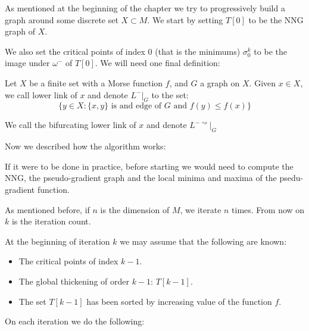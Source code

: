 As mentioned at the beginning of the chapter we try to progressively build a 
graph around some discrete set $X\subset M$. We start by setting
$T[0]$ to be the NNG graph of $X$.

We also set the critical points of index $0$ (that is the minimums) 
$\sigma_0^k$ to be the image under $\omega^-$
of $T[0]$.
We will need one final definition:

\begin{definition}
    Let $X$ be a finite set with a Morse function $f$, and $G$ a graph on $X$.
    Given $x\in X$, we call lower link of $x$ and denote $L^-\vert_G$ to the 
    set:
    $$
        \{y\in X: \{x,y\} \text{ is and edge of } G \text{ and } f(y)\leq f(x)\}
    $$
    
    We call the bifurcating lower link of $x$ and denote $L^{-\rightsquigarrow}\vert_G$
\end{definition}

Now we described how the algorithm works:

If it were to be done in practice, before starting we would need to 
compute the NNG, the pseudo-gradient graph and the local minima and maxima 
of the psedu-gradient function.

As mentioned before, if $n$ is the dimension of $M$,
we iterate $n$ times. 
From now on $k$ is the iteration count.

At the beginning of iteration $k$ we may assume 
that the following are known:

\begin{itemize}
    \item The critical points of index $k-1$.

    \item The global thickening of order $k-1$: $T[k-1]$.

    \item The set $T[k-1]$ has been sorted by increasing value of the function $f$.
\end{itemize}

On each iteration we do the following:



